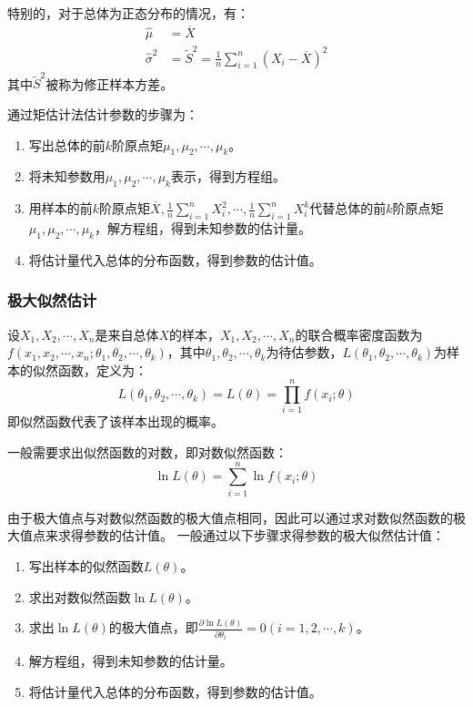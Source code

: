 \documentclass[a4paper,12pt]{ctexart}
\begin{document}
特别的，对于总体为正态分布的情况，有：
\begin{align*}
	\hat{\mu} &= \overline{X} \\
	\hat{\sigma}^2 &= \widetilde{S}^2 = \frac{1}{n}\sum_{i=1}^n(X_i - \overline{X})^2
\end{align*}
其中$\widetilde{S}^2$被称为修正样本方差。

通过矩估计法估计参数的步骤为：
\begin{enumerate}
	\item 写出总体的前$k$阶原点矩$\mu_1,\mu_2,\cdots,\mu_k$。
	\item 将未知参数用$\mu_1,\mu_2,\cdots,\mu_k$表示，得到方程组。
	\item 用样本的前$k$阶原点矩$\overline{X},\frac{1}{n}\sum_{i=1}^nX_i^2,\cdots,\frac{1}{n}\sum_{i=1}^nX_i^k$代替总体的前$k$阶原点矩$\mu_1,\mu_2,\cdots,\mu_k$，解方程组，得到未知参数的估计量。
	\item 将估计量代入总体的分布函数，得到参数的估计值。
\end{enumerate}

\subsubsection{极大似然估计}

设$X_1,X_2,\cdots,X_n$是来自总体$X$的样本，$X_1,X_2,\cdots,X_n$的联合概率密度函数为$f(x_1,x_2,\cdots,x_n;\theta_1,\theta_2,\cdots,\theta_k)$，其中$\theta_1,\theta_2,\cdots,\theta_k$为待估参数，$L(\theta_1,\theta_2,\cdots,\theta_k)$为样本的似然函数，定义为：
\begin{equation*}
	L(\theta_1,\theta_2,\cdots,\theta_k) = L(\theta) = \prod_{i=1}^nf(x_i;\theta)
\end{equation*}
即似然函数代表了该样本出现的概率。

一般需要求出似然函数的对数，即对数似然函数：
\begin{equation*}
	\ln L(\theta) = \sum_{i=1}^n\ln f(x_i;\theta)
\end{equation*}

由于极大值点与对数似然函数的极大值点相同，因此可以通过求对数似然函数的极大值点来求得参数的估计值。
一般通过以下步骤求得参数的极大似然估计值：
\begin{enumerate}
	\item 写出样本的似然函数$L(\theta)$。
	\item 求出对数似然函数$\ln L(\theta)$。
	\item 求出$\ln L(\theta)$的极大值点，即$\frac{\partial \ln L(\theta)}{\partial \theta_i} = 0(i = 1,2,\cdots,k)$。
	\item 解方程组，得到未知参数的估计量。
	\item 将估计量代入总体的分布函数，得到参数的估计值。
\end{enumerate}
\end{document}

